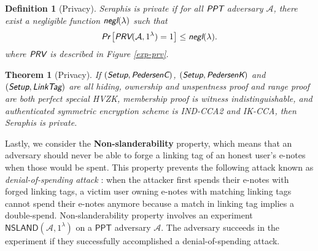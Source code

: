 \documentclass{article}
\newtheorem{definition}{Definition}[section]
\newtheorem{theorem}{Theorem}[section]
\begin{document}
\begin{definition}[Privacy]
Seraphis is private if for all $\emph{\textsf{PPT}}$ adversary $\mathcal{A}$, there exist a negligible function $\emph{\textsf{negl}}(\lambda)$ such that
\begin{align*}
\emph{\textsf{Pr}}
\left[
\emph{\textsf{PRV}}(\mathcal{A}, 1^{\lambda})=1
\right]
\le \emph{\textsf{negl}}(\lambda).
\end{align*}
where $\emph{\textsf{PRV}}$ is described in Figure \ref{exp-prv}.
\end{definition}
\begin{theorem}[Privacy]\label{thm-prv}
If $(\emph{\textsf{Setup}},\emph{\textsf{PedersenC}})$, $(\emph{\textsf{Setup}},\emph{\textsf{PedersenK}})$ and $(\emph{\textsf{Setup}},\emph{\textsf{LinkTag}})$ are all hiding, ownership and unspentness proof and range proof are both perfect special HVZK, membership proof is witness indistinguishable, and authenticated symmetric encryption scheme is IND-CCA2 and IK-CCA, then Seraphis is private.  
\end{theorem}

Lastly, we consider the \textbf{Non-slanderability} property, which means that an adversary should never be able to forge a linking tag of an honest user's e-notes when those would be spent. This property prevents the following attack known as \textit{denial-of-spending attack} \cite{denial-of-spend}: when the attacker first spends their e-notes with forged linking tags, a victim user owning e-notes with matching linking tags cannot spend their e-notes anymore because a match in linking tag implies a double-spend. Non-slanderability property involves an experiment $\textsf{NSLAND}(\mathcal{A}, 1^{\lambda})$ on a $\textsf{PPT}$ adversary $\mathcal{A}$. The adversary succeeds in the experiment if they successfully accomplished a denial-of-spending attack.
\end{document}
